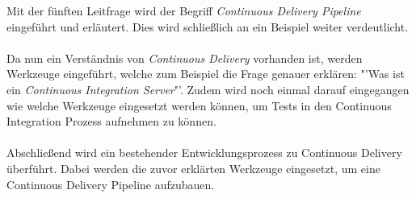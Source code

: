 Mit der fünften Leitfrage wird der Begriff \textit{Continuous Delivery Pipeline} eingeführt und erläutert. Dies wird schließlich an ein Beispiel weiter verdeutlicht.\\\\
Da nun ein Verständnis von \textit{Continuous Delivery} vorhanden ist, werden Werkzeuge eingeführt, welche zum Beispiel die Frage genauer erklären: "'Was ist ein \textit{Continuous Integration Server}"'. Zudem wird noch einmal darauf eingegangen wie welche Werkzeuge eingesetzt werden können, um Tests in den Continuous Integration Prozess aufnehmen zu können.\\\\
Abschließend wird ein bestehender Entwicklungsprozess zu Continuous Delivery überführt. Dabei werden die zuvor erklärten Werkzeuge eingesetzt, um eine Continuous Delivery Pipeline aufzubauen.

